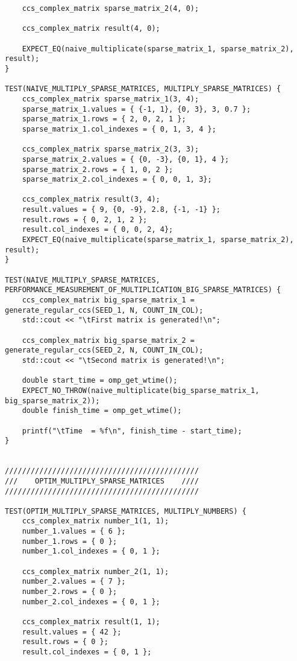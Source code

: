 \documentclass{report}
\begin{document}
\begin{itemize}
\begin{itemize}
\begin{lstlisting}
    ccs_complex_matrix sparse_matrix_2(4, 0);
    
    ccs_complex_matrix result(4, 0);

    EXPECT_EQ(naive_multiplicate(sparse_matrix_1, sparse_matrix_2), result);
}

TEST(NAIVE_MULTIPLY_SPARSE_MATRICES, MULTIPLY_SPARSE_MATRICES) {
    ccs_complex_matrix sparse_matrix_1(3, 4);
    sparse_matrix_1.values = { {-1, 1}, {0, 3}, 3, 0.7 };
    sparse_matrix_1.rows = { 2, 0, 2, 1 };
    sparse_matrix_1.col_indexes = { 0, 1, 3, 4 };
    
    ccs_complex_matrix sparse_matrix_2(3, 3);
    sparse_matrix_2.values = { {0, -3}, {0, 1}, 4 };
    sparse_matrix_2.rows = { 1, 0, 2 };
    sparse_matrix_2.col_indexes = { 0, 0, 1, 3};
    
    ccs_complex_matrix result(3, 4);
    result.values = { 9, {0, -9}, 2.8, {-1, -1} };
    result.rows = { 0, 2, 1, 2 };
    result.col_indexes = { 0, 0, 2, 4};
    EXPECT_EQ(naive_multiplicate(sparse_matrix_1, sparse_matrix_2), result);
}

TEST(NAIVE_MULTIPLY_SPARSE_MATRICES, PERFORMANCE_MEASUREMENT_OF_MULTIPLICATION_BIG_SPARSE_MATRICES) {
    ccs_complex_matrix big_sparse_matrix_1 = generate_regular_ccs(SEED_1, N, COUNT_IN_COL);
    std::cout << "\tFirst matrix is generated!\n";

    ccs_complex_matrix big_sparse_matrix_2 = generate_regular_ccs(SEED_2, N, COUNT_IN_COL);
    std::cout << "\tSecond matrix is generated!\n";

    double start_time = omp_get_wtime();
    EXPECT_NO_THROW(naive_multiplicate(big_sparse_matrix_1, big_sparse_matrix_2));
    double finish_time = omp_get_wtime();

    printf("\tTime  = %f\n", finish_time - start_time);
}


/////////////////////////////////////////////
///    OPTIM_MULTIPLY_SPARSE_MATRICES    ////
/////////////////////////////////////////////

TEST(OPTIM_MULTIPLY_SPARSE_MATRICES, MULTIPLY_NUMBERS) {
    ccs_complex_matrix number_1(1, 1);
    number_1.values = { 6 };
    number_1.rows = { 0 };
    number_1.col_indexes = { 0, 1 };
    
    ccs_complex_matrix number_2(1, 1);
    number_2.values = { 7 };
    number_2.rows = { 0 };
    number_2.col_indexes = { 0, 1 };
    
    ccs_complex_matrix result(1, 1);
    result.values = { 42 };
    result.rows = { 0 };
    result.col_indexes = { 0, 1 };


\end{lstlisting}
\end{itemize}
\end{itemize}
\end{document}
